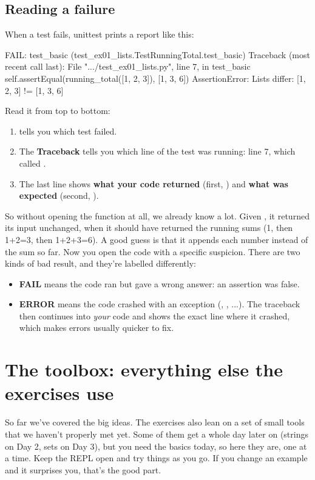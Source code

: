 \documentclass[10pt,a4paper]{article}
\begin{document}
\subsection{Reading a failure}
When a test fails, unittest prints a report like this:
\begin{txtcode}
FAIL: test_basic (test_ex01_lists.TestRunningTotal.test_basic)
Traceback (most recent call last):
  File ".../test_ex01_lists.py", line 7, in test_basic
    self.assertEqual(running_total([1, 2, 3]), [1, 3, 6])
AssertionError: Lists differ: [1, 2, 3] != [1, 3, 6]
\end{txtcode}
Read it from top to bottom:
\begin{enumerate}
\item \textbf{} tells you which test failed.
\item The \textbf{Traceback} tells you which line of the test was running: line 7, which called .
\item The last line shows \textbf{what your code returned} (first, ) and \textbf{what was expected} (second, ).
\end{enumerate}
So without opening the function at all, we already know a lot. Given , it returned its input unchanged, when it should have returned the running sums (1, then 1+2=3, then 1+2+3=6). A good guess is that it appends each number instead of the sum so far. Now you open the code with a specific suspicion.
There are two kinds of bad result, and they’re labelled differently:
\begin{itemize}
\item \textbf{FAIL} means the code ran but gave a wrong answer: an assertion was false.
\item \textbf{ERROR} means the code crashed with an exception (, , ...). The traceback then continues into \emph{your} code and shows the exact line where it crashed, which makes errors usually quicker to fix.
\end{itemize}
\setcounter{section}{7}
\section{The toolbox: everything else the exercises use}
So far we’ve covered the big ideas. The exercises also lean on a set of small tools that we haven’t properly met yet. Some of them get a whole day later on (strings on Day 2, sets on Day 3), but you need the basics today, so here they are, one at a time. Keep the REPL open and try things as you go. If you change an example and it surprises you, that’s the good part.
\end{document}
